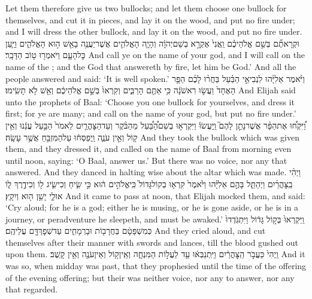 {Let them therefore give us two bullocks; and let them choose one bullock for themselves, and cut it in pieces, and lay it on the wood, and put no fire under; and I will dress the other bullock, and lay it on the wood, and put no fire under.}
{וּקְרָאתֶ֞ם בְּשֵׁ֣ם אֱלֹהֵיכֶ֗ם וַֽאֲנִי֙ אֶקְרָ֣א בְשֵׁם\maqqaf יְהֹוָ֔ה וְהָיָ֧ה הָאֱלֹהִ֛ים אֲשֶׁר\maqqaf יַעֲנֶ֥ה בָאֵ֖שׁ ה֣וּא הָאֱלֹהִ֑ים וַיַּ֧עַן כׇּל\maqqaf הָעָ֛ם וַיֹּאמְר֖וּ ט֥וֹב הַדָּבָֽר׃}
{And call ye on the name of your god, and I will call on the name of the \lord; and the God that answereth by fire, let him be God.’ And all the people answered and said: ‘It is well spoken.’}
{וַיֹּ֨אמֶר אֵלִיָּ֜הוּ לִנְבִיאֵ֣י הַבַּ֗עַל בַּחֲר֨וּ לָכֶ֜ם הַפָּ֤ר הָאֶחָד֙ וַעֲשׂ֣וּ רִאשֹׁנָ֔ה כִּ֥י אַתֶּ֖ם הָרַבִּ֑ים וְקִרְאוּ֙ בְּשֵׁ֣ם אֱלֹהֵיכֶ֔ם וְאֵ֖שׁ לֹ֥א תָשִֽׂימוּ׃}
{And Elijah said unto the prophets of Baal: ‘Choose you one bullock for yourselves, and dress it first; for ye are many; and call on the name of your god, but put no fire under.’}
{וַ֠יִּקְח֠וּ אֶת\maqqaf הַפָּ֨ר אֲשֶׁר\maqqaf נָתַ֣ן לָהֶם֮ וַֽיַּעֲשׂוּ֒ וַיִּקְרְא֣וּ בְשֵׁם\maqqaf הַ֠בַּ֠עַל מֵהַבֹּ֨קֶר וְעַד\maqqaf הַצׇּהֳרַ֤יִם לֵאמֹר֙ הַבַּ֣עַל עֲנֵ֔נוּ וְאֵ֥ין ק֖וֹל וְאֵ֣ין עֹנֶ֑ה וַֽיְפַסְּח֔וּ עַל\maqqaf הַמִּזְבֵּ֖חַ אֲשֶׁ֥ר עָשָֽׂה׃}
{And they took the bullock which was given them, and they dressed it, and called on the name of Baal from morning even until noon, saying: ‘O Baal, answer us.’ But there was no voice, nor any that answered. And they danced in halting wise about the altar which was made.}
{וַיְהִ֨י בַֽצׇּהֳרַ֜יִם וַיְהַתֵּ֧ל בָּהֶ֣ם אֵלִיָּ֗הוּ וַיֹּ֙אמֶר֙ קִרְא֤וּ בְקוֹל\maqqaf גָּדוֹל֙ כִּֽי\maqqaf אֱלֹהִ֣ים ה֔וּא כִּ֣י שִׂ֧יחַ וְכִי\maqqaf שִׂ֛יג ל֖וֹ וְכִי\maqqaf דֶ֣רֶךְ ל֑וֹ אוּלַ֛י יָשֵׁ֥ן ה֖וּא וְיִקָֽץ׃}
{And it came to pass at noon, that Elijah mocked them, and said: ‘Cry aloud; for he is a god; either he is musing, or he is gone aside, or he is in a journey, or peradventure he sleepeth, and must be awaked.’}
{וַֽיִּקְרְאוּ֙ בְּק֣וֹל גָּד֔וֹל וַיִּתְגֹּֽדְדוּ֙ כְּמִשְׁפָּטָ֔ם בַּחֲרָב֖וֹת וּבָרְמָחִ֑ים עַד\maqqaf שְׁפׇךְ\maqqaf דָּ֖ם עֲלֵיהֶֽם׃}
{And they cried aloud, and cut themselves after their manner with swords and lances, till the blood gushed out upon them.}
{וַֽיְהִי֙ כַּעֲבֹ֣ר הַֽצׇּהֳרַ֔יִם וַיִּֽתְנַבְּא֔וּ עַ֖ד לַעֲל֣וֹת הַמִּנְחָ֑ה וְאֵֽין\maqqaf ק֥וֹל וְאֵין\maqqaf עֹנֶ֖ה וְאֵ֥ין קָֽשֶׁב׃}
{And it was so, when midday was past, that they prophesied until the time of the offering of the evening offering; but their was neither voice, nor any to answer, nor any that regarded.}
